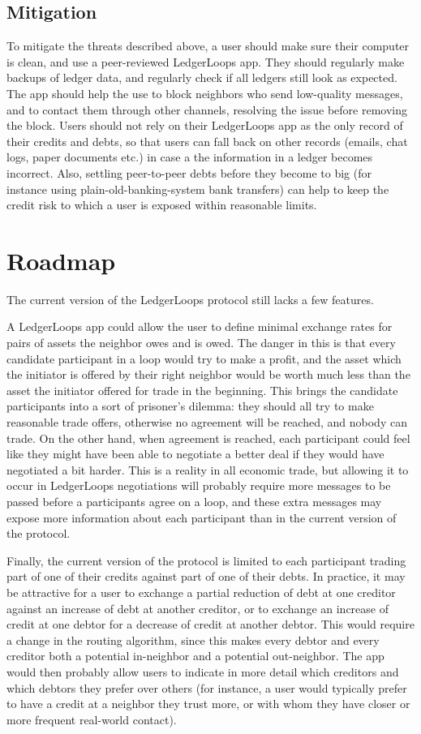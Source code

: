 \documentclass[11pt,twoside,a4paper]{article}
\begin{document}
\subsection{Mitigation}
To mitigate the threats described above, a user should make sure their computer is clean, and use a peer-reviewed LedgerLoops app.
They should regularly make backups of ledger data, and regularly check if all ledgers still look as expected.
The app should help the use to block neighbors who send low-quality messages, and to contact them through other channels, resolving the issue before removing the block.
Users should not rely on their LedgerLoops app as the only record of their credits and debts, so that users can fall back on other records (emails, chat logs, paper documents etc.) in case a the information in a ledger becomes incorrect. Also, settling peer-to-peer debts before they become to big (for instance using plain-old-banking-system bank transfers) can help to keep the credit risk to which a user is exposed within reasonable limits.

\section{Roadmap}
The current version of the LedgerLoops protocol still lacks a few features. 

A LedgerLoops app could allow the user to define minimal exchange rates for pairs of assets the neighbor owes and is owed. The danger in this is that every candidate participant in a loop would try to make a profit, and the asset which the initiator is offered by their right neighbor would be worth much less than the asset the initiator offered for trade in the beginning. This brings the candidate participants into a sort of prisoner's dilemma: they should all try to make reasonable trade offers, otherwise no agreement will be reached, and nobody can trade. On the other hand, when agreement is reached, each participant could feel like they might have been able to negotiate a better deal if they would have negotiated a bit harder. This is a reality in all economic trade, but allowing it to occur in LedgerLoops negotiations will probably require more messages to be passed before a participants agree on a loop, and these extra messages may expose more information about each participant than in the current version of the protocol.

Finally, the current version of the protocol is limited to each participant trading part of one of their credits against part of one of their debts. In practice, it may be attractive for a user to exchange a partial reduction of debt at one creditor against an increase of debt at another creditor, or to exchange an increase of credit at one debtor for a decrease of credit at another debtor. This would require a change in the routing algorithm, since this makes every debtor and every creditor both a potential in-neighbor and a potential out-neighbor. The app would then probably allow users to indicate in more detail which creditors and which debtors they prefer over others (for instance, a user would typically prefer to have a credit at a neighbor they trust more, or with whom they have closer or more frequent real-world contact).
\end{document}
